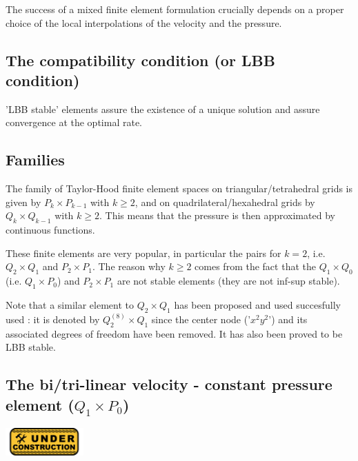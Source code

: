 

The success of a mixed finite element formulation crucially depends on a proper choice of the local interpolations of the velocity and the pressure. 

\subsection{The compatibility condition (or LBB condition)}
 

'LBB stable' elements assure the existence of a unique solution 
and assure convergence at the optimal rate. 

\subsection{Families}


The family of Taylor-Hood finite element spaces on triangular/tetrahedral 
grids is given by $P_k \times P_{k-1}$ with $k\geq 2$, 
and on quadrilateral/hexahedral grids by $Q_k \times Q_{k-1}$ with $k\geq 2$.
This means that the pressure is then approximated by continuous functions. 

These finite elements are very popular, in particular the pairs for $k=2$, i.e.
$Q_2\times Q_1$ and $P_2\times P_1$.
The reason why $k\geq 2$ comes from the fact that the 
$Q_1 \times Q_0$ (i.e. $Q_1 \times P_0$) and $P_2\times P_1$
are not stable elements (they are not inf-sup stable). 

\begin{remark}
Note that a similar element to $Q_2 \times Q_1$ has been proposed
and used succesfully used \cite{taho73,hota74}: it is denoted by $Q_2^{(8)} \times Q_1$ 
since the center node ('$x^2y^2$') and its associated degrees of freedom have been removed. It 
has also been proved to be LBB stable. 
\end{remark}


\subsection{The bi/tri-linear velocity - constant pressure element ($Q_1\times P_0$)}
\includegraphics[width=3cm]{images/under_construction}

